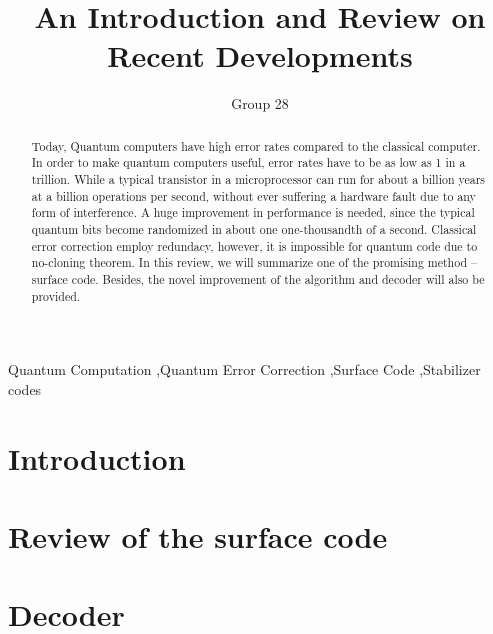 \documentclass[final,5p,times,twocolumn,authoryear]{elsarticle}
\begin{document}
\begin{frontmatter}

    \title{An Introduction and Review on Recent Developments}

    \author{Group 28}

    \begin{abstract}
        Today, Quantum computers have high error rates compared to the classical computer. In order to make quantum computers useful, error rates have to be as low as 1 in a trillion. While a typical transistor in a microprocessor can run for about a billion years at a billion operations per second, without ever suffering a hardware fault due to any form of interference. A huge improvement in performance is needed, since the typical quantum bits become randomized in about one one-thousandth of a second. Classical error correction employ redundacy, however, it is impossible for quantum code due to no-cloning theorem. In this review, we will summarize one of the promising method – surface code. Besides, the novel improvement of the algorithm and decoder will also be provided.
    \end{abstract}

    \begin{keyword}
        Quantum Computation \sep Quantum Error Correction \sep Surface Code \sep Stabilizer codes
    \end{keyword}


\end{frontmatter}




\section{Introduction}
\label{introduction}


\section{Review of the surface code}
\label{review}


\section{Decoder}
\label{decoder}

\end{document}
